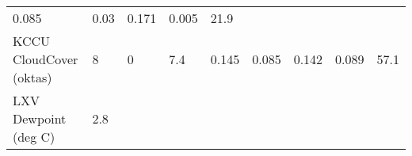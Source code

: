 \documentclass[11pt]{article}
\begin{document}
\begin{longtable}[]{@{}lllllllll@{}}
\begin{minipage}[t]{0.05\columnwidth}
0.085\strut
\end{minipage} & \begin{minipage}[t]{0.07\columnwidth}\raggedright\strut
0.03\strut
\end{minipage} & \begin{minipage}[t]{0.06\columnwidth}\raggedright\strut
0.171\strut
\end{minipage} & \begin{minipage}[t]{0.06\columnwidth}\raggedright\strut
0.005\strut
\end{minipage} & \begin{minipage}[t]{0.07\columnwidth}\raggedright\strut
21.9\strut
\end{minipage}\tabularnewline
\begin{minipage}[t]{0.25\columnwidth}\raggedright\strut
KCCU CloudCover (oktas)\strut
\end{minipage} & \begin{minipage}[t]{0.06\columnwidth}\raggedright\strut
8\strut
\end{minipage} & \begin{minipage}[t]{0.06\columnwidth}\raggedright\strut
0\strut
\end{minipage} & \begin{minipage}[t]{0.08\columnwidth}\raggedright\strut
7.4\strut
\end{minipage} & \begin{minipage}[t]{0.05\columnwidth}\raggedright\strut
0.145\strut
\end{minipage} & \begin{minipage}[t]{0.07\columnwidth}\raggedright\strut
0.085\strut
\end{minipage} & \begin{minipage}[t]{0.06\columnwidth}\raggedright\strut
0.142\strut
\end{minipage} & \begin{minipage}[t]{0.06\columnwidth}\raggedright\strut
0.089\strut
\end{minipage} & \begin{minipage}[t]{0.07\columnwidth}\raggedright\strut
57.1\strut
\end{minipage}\tabularnewline
\begin{minipage}[t]{0.25\columnwidth}\raggedright\strut
LXV Dewpoint (deg C)\strut
\end{minipage} & \begin{minipage}[t]{0.06\columnwidth}\raggedright\strut
2.8\strut
\end{minipage} & \begin{minipage}[t]{0.06\columnwidth}\raggedright\strut

\end{minipage}
\end{longtable}
\end{document}
